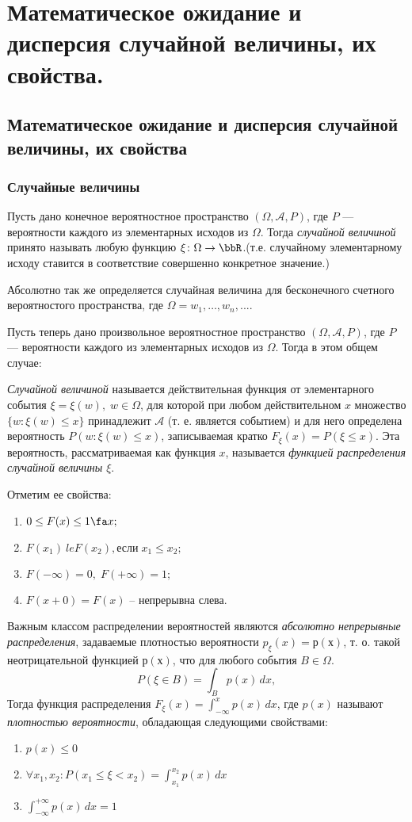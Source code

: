 \chapter{Математическое ожидание и дисперсия случайной величины, их свойства.}
\section{Математическое ожидание и дисперсия случайной величины, их свойства}

\subsection{Случайные величины}

Пусть дано конечное вероятностное пространство $(\Omega,\mathcal A, P)$, где $P$ --- вероятности каждого из элементарных исходов из $\Omega$. Тогда \textit{случайной величиной} принято называть любую функцию $\xi\colon \Omega \to \bbR$.(т.е. случайному элементарному исходу ставится в соответствие совершенно конкретное значение.)

Абсолютно так же определяется случайная величина для бесконечного счетного вероятностого пространства, где $\Omega = {w_1,\dots, w_n,...}$.

Пусть теперь дано произвольное вероятностное пространство $(\Omega,\mathcal A, P)$, где $P$ --- вероятности каждого из элементарных исходов из $\Omega$. Тогда в этом общем случае:
\begin{defn}
\textit{Случайной величиной} называется действительная функция от элементарного события $\xi = \xi(w), \; w\in\Omega$, для которой при любом действительном $x$ множество $\{w: \xi(w) \le x\}$ принадлежит $\mathcal A$ (т. е. является событием) и для него определена вероятность $P(w: \xi(w) \le x)$, записываемая кратко $F_\xi(x)=P(\xi \le x)$. Эта вероятность, рассматриваемая как функция $x$, называется \textit{функцией распределения случайной величины $\xi$}.
\end{defn}
Отметим ее свойства:
\begin{enumerate}
\item 
$0 \le F(x) \le 1 \fa x;$ 
\item
$F(x_1) \ le F(x_2), \text{если}\; x_1\le x_2;$
\item
$F(-\infty)=0, \; F(+\infty)=1;$
\item
$F(x+0)=F(x)$ -- непрерывна слева.
\end{enumerate}
Важным классом распределении вероятностей являются \textit{абсолютно непрерывные распределения}, задаваемые плотностью вероятности $p_\xi(x) = р(х)$, т. о. такой неотрицательной функцией $р(х)$, что для любого события $B\in\Omega$.
$$
P(\xi \in B)=\int_B p(x)\,dx,
$$
Тогда функция распределения $F_\xi(x)=\int_{-\infty}^{x}p(x)\,dx$, где $p(x)$ называют \textit{плотностью вероятности}, обладающая следующими свойствами:
\begin{enumerate}
\item 
$p(x)\le 0$
\item 
$\forall x_1,x_2: P(x_1\le\xi<x_2)=\int_{x_1}^{x_2}p(x)\,dx$
\item
$\int_{-\infty}^{+\infty}p(x)\,dx=1$
\end{enumerate}

